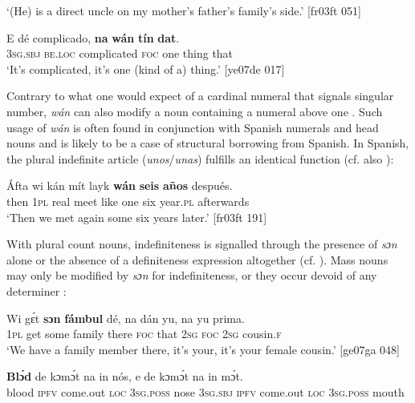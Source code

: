 \glt ‘(He) is a direct uncle on my mother’s father’s family’s side.’ [fr03ft 051]
\z


\ea%
    \label{ex:key:179}
    \gll E    dé    complicado,  \textbf{na}  \textbf{wán}    \textbf{tín}    \textbf{dat}.\\
\textsc{3sg.sbj}  \textsc{be.loc}  complicated  \textsc{foc}  one    thing  that\\

\glt ‘It’s complicated, it’s one (kind of a) thing.’ [ye07de 017]
\z

Contrary to what one would expect of a cardinal numeral that signals singular number, \textit{wán} can also modify a noun containing a numeral above one . Such usage of \textit{wán} is often found in conjunction with Spanish numerals and head nouns and is likely to be a case of structural borrowing from Spanish. In Spanish, the plural indefinite article (\textit{unos}/\textit{unas}) fulfills an identical function (cf. also ): 


\ea%
    \label{ex:key:180}
    \gll \'{A}fta    wi  kán  mít    layk    \textbf{wán}    \textbf{seis}    \textbf{años}  después.\\
then  \textsc{1pl}  real  meet  like    one    six    year.\textsc{pl}  afterwards\\

\glt ‘Then we met again some six years later.’ [fr03ft 191]
\z

With plural count nouns, indefiniteness is signalled through the presence of \textit{sɔn} alone  or the absence of a definiteness expression altogether (cf. ). Mass nouns may only be modified by \textit{sɔn} for indefiniteness, or they occur devoid of any determiner : 


\ea%
    \label{ex:key:181}
    \gll Wi  gɛ́t  \textbf{sɔn}    \textbf{fámbul}  dé,    na  dán  yu,  na  yu  prima.\\
\textsc{1pl}  get  some  family  there  \textsc{foc}  that  \textsc{2sg}  \textsc{foc}  \textsc{2sg}  cousin.\textsc{f}\\

\glt ‘We have a family member there, it’s your, it’s your female cousin.’ [ge07ga 048]
\z


\ea%
    \label{ex:key:182}
    \gll \textbf{Blɔ́d}  de  kɔmɔ́t    na  in    nós,    e    de  kɔmɔ́t
na  in    mɔ́t.\\
blood  \textsc{ipfv}  come.out  \textsc{loc}  \textsc{3sg.poss}  nose  \textsc{3sg.sbj}  \textsc{ipfv}  come.out
\textsc{loc}  \textsc{3sg.poss}  mouth\\

